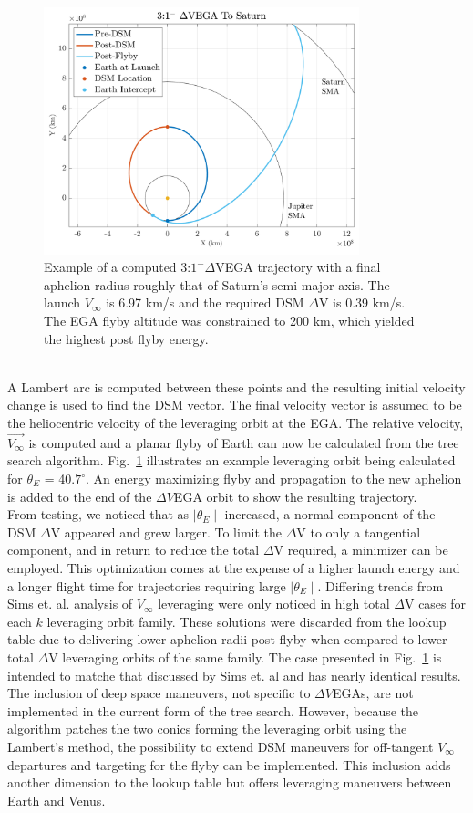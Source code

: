 \documentclass[letterpaper, paper,11pt]{./AAS}		%
\begin{document}
%
%
\begin{figure}[htb]
	\centering\includegraphics[width=3.6in]{./Figures/dsmmatlab}
	\caption{Example of a computed 3:$1^{-} \Delta$VEGA trajectory with a final aphelion radius roughly that of Saturn's semi-major axis. The launch $V_\infty$ is 6.97 km/s and the required DSM $\Delta$V is 0.39 km/s. The EGA flyby altitude was constrained to 200 km, which yielded the highest post flyby energy.}
	\label{fig:dsmmatlab}
\end{figure}
%
\\A Lambert arc is computed between these points and the resulting initial velocity change is used to find the DSM vector. The final velocity vector is assumed to be the heliocentric velocity of the leveraging orbit at the EGA. The relative velocity, $\vec{V_\infty}$ is computed and a planar flyby of Earth can now be calculated from the tree search algorithm. Fig.~\ref{fig:dsmmatlab} illustrates an example leveraging orbit being calculated for $\theta_{E}$ = 40.$7^{\circ}$. An energy maximizing flyby and propagation to the new aphelion is added to the end of the $\Delta V$EGA orbit to show the resulting trajectory.
\\\indent From testing, we noticed that as $\mid\theta_E\mid$ increased, a normal component of the DSM $\Delta$V appeared and grew larger. To limit the $\Delta$V to only a tangential component, and in return to reduce the total $\Delta$V required, a minimizer can be employed. This optimization comes at the expense of a higher launch energy and a longer flight time for trajectories requiring large $\mid\theta_E\mid$. Differing trends from Sims et. al. analysis of $V_\infty$ leveraging\cite{sims1994} were only noticed in high total $\Delta$V cases for each $k$ leveraging orbit family. These solutions were discarded from the lookup table due to delivering lower aphelion radii post-flyby when compared to lower total $\Delta$V leveraging orbits of the same family. The case presented in Fig.~\ref{fig:dsmmatlab} is intended to matche that discussed by Sims et. al\cite{Sims1997} and has nearly identical results. The inclusion of deep space maneuvers, not specific to $\Delta V$EGAs, are not implemented in the current form of the tree search. However, because the algorithm patches the two conics forming the leveraging orbit using the Lambert's method, the possibility to extend DSM maneuvers for off-tangent $V_\infty$ departures and targeting for the flyby can be implemented. This inclusion adds another dimension to the lookup table but offers leveraging maneuvers between Earth and Venus.
\end{document}
